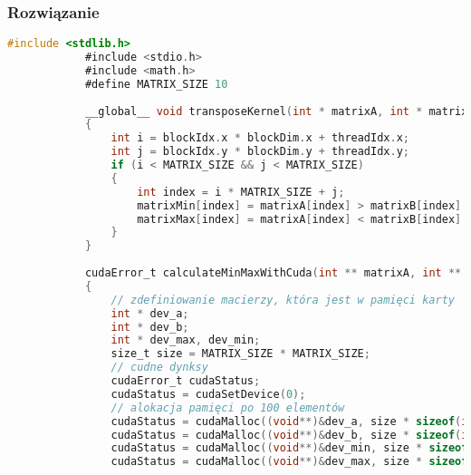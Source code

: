 		\subsubsection{Rozwiązanie}
		\begin{lstlisting}[language=C]
			#include <stdlib.h>
			#include <stdio.h>
			#include <math.h>
			#define MATRIX_SIZE 10
			
			__global__ void transposeKernel(int * matrixA, int * matrixB, int * matrixMin, int * matrixMax)
			{
				int i = blockIdx.x * blockDim.x + threadIdx.x;
				int j = blockIdx.y * blockDim.y + threadIdx.y;
				if (i < MATRIX_SIZE && j < MATRIX_SIZE)
				{
					int index = i * MATRIX_SIZE + j;
					matrixMin[index] = matrixA[index] > matrixB[index] ? matrixB[index] : matrixA[index];
					matrixMax[index] = matrixA[index] < matrixB[index] ? matrixB[index] : matrixA[index];
				}
			}
			
			cudaError_t calculateMinMaxWithCuda(int ** matrixA, int ** matrixB, int ** matrixMin, int ** matrixMax)
			{
				// zdefiniowanie macierzy, która jest w pamięci karty
				int * dev_a;
				int * dev_b;
				int * dev_max, dev_min;
				size_t size = MATRIX_SIZE * MATRIX_SIZE;
				// cudne dynksy
				cudaError_t cudaStatus;
				cudaStatus = cudaSetDevice(0);
				// alokacja pamięci po 100 elementów
				cudaStatus = cudaMalloc((void**)&dev_a, size * sizeof(int));
				cudaStatus = cudaMalloc((void**)&dev_b, size * sizeof(int));
				cudaStatus = cudaMalloc((void**)&dev_min, size * sizeof(int));
				cudaStatus = cudaMalloc((void**)&dev_max, size * sizeof(int));
			\end{lstlisting}
			\newpage
